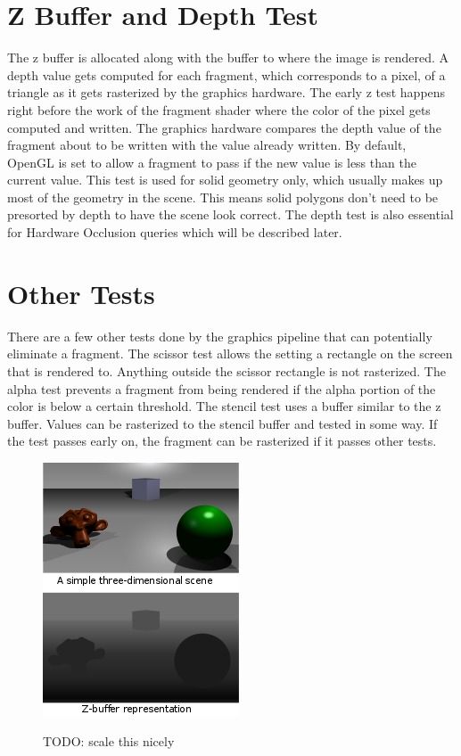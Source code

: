 \documentclass[12pt]{ucthesis}
\newcommand{\captionfonts}{\small\bf\ssp}
\begin{document}
\section{Z Buffer and Depth Test}
\label{z-buffer-and-depth-test}

The z buffer is allocated along with the buffer to where the image is rendered.
A depth value gets computed for each fragment, which corresponds to a pixel, of a triangle as it gets rasterized by the graphics hardware.
The early z test happens right before the work of the fragment shader where the color of the pixel gets computed and written.\cite{d3d11-pipeline}
The graphics hardware compares the depth value of the fragment about to be written with the value already written.
By default, OpenGL is set to allow a fragment to pass if the new value is less than the current value.\cite{gl-depth-func}
This test is used for solid geometry only, which usually makes up most of the geometry in the scene.
This means solid polygons don't need to be presorted by depth to have the scene look correct.
The depth test is also essential for Hardware Occlusion queries which will be described later.

\section{Other Tests}
\label{other-tests}

There are a few other tests done by the graphics pipeline that can potentially eliminate a fragment.\cite{GpuGem-Occlusion}
The scissor test allows the setting a rectangle on the screen that is rendered to.
Anything outside the scissor rectangle is not rasterized.
The alpha test prevents a fragment from being rendered if the alpha portion of the color is below a certain threshold.
The stencil test uses a buffer similar to the z buffer.\cite{d3d11-pipeline}
Values can be rasterized to the stencil buffer and tested in some way.
If the test passes early on, the fragment can be rasterized if it passes other tests.

\begin{figure}
\begin{center}
\includegraphics{Images/Z_buffer.png}
\captionfonts
\caption[Z Buffer]{TODO: scale this nicely}
\label{fig:z-buffer}
\end{center}
\end{figure}
\end{document}
